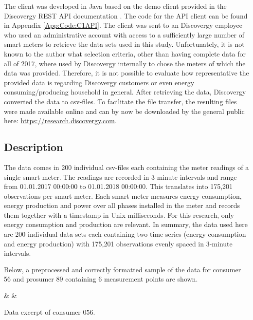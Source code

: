 The client was developed in Java based on the demo client provided in the Discovergy REST API documentation \citep{DiscovergyAPI:2018}. The code for the API client can be found in Appendix \ref{App:Code:C1API}. The client was sent to an Discovergy employee who used an administrative account with access to a sufficiently large number of smart meters to retrieve the data sets used in this study. Unfortunately, it is not known to the author what selection criteria, other than having complete data for all of 2017, where used by Discovergy internally to chose the meters of which the data was provided. Therefore, it is not possible to evaluate how representative the provided data is regarding Discovergy customers or even energy consuming/producing household in general.
After retrieving the data, Discovergy converted the data to csv-files. To facilitate the file transfer, the resulting files were made available online and can by now be downloaded by the general public here: \href{https://research.discovergy.com}{https://research.discovergy.com}. 




\subsection{Description}\label{Sec:Data;Subsec:Description}

The data comes in 200 individual csv-files each containing the meter readings of a single smart meter. The readings are recorded in 3-minute intervals and range from 01.01.2017 00:00:00 to 01.01.2018 00:00:00. This translates into 175,201 observations per smart meter. Each smart meter measures energy consumption,  energy production and power over all phases installed in the meter and records them together with a timestamp in Unix milliseconds. For this research, only energy consumption and production are relevant. In summary, the data used here are 200 individual data sets each containing two time series (energy consumption and energy production) with 175,201 observations evenly spaced in 3-minute intervals.

Below, a preprocessed and correctly formatted sample of the data for consumer 56 and prosumer 89 containing 6 measurement points are shown.

\begin{table}[htbp]
    {\csvcolii & \csvcoliii & \csvcoliv}%
    \caption[Data excerpt of consumer 056]{Data excerpt of consumer 056. \quantnet}
    \label{Tab:c056}
\end{table}

